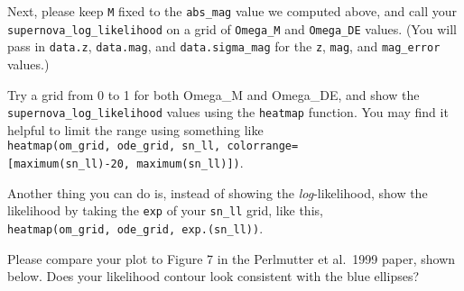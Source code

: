 \documentclass[11pt]{article}
\begin{document}
    Next, please keep \texttt{M} fixed to the \texttt{abs\_mag} value we
computed above, and call your \texttt{supernova\_log\_likelihood} on a
grid of \texttt{Omega\_M} and \texttt{Omega\_DE} values. (You will pass
in \texttt{data.z}, \texttt{data.mag}, and \texttt{data.sigma\_mag} for
the \texttt{z}, \texttt{mag}, and \texttt{mag\_error} values.)

Try a grid from 0 to 1 for both Omega\_M and Omega\_DE, and show the
\texttt{supernova\_log\_likelihood} values using the \texttt{heatmap}
function. You may find it helpful to limit the range using something
like
\texttt{heatmap(om\_grid,\ ode\_grid,\ sn\_ll,\ colorrange={[}maximum(sn\_ll)-20,\ maximum(sn\_ll){]})}.

Another thing you can do is, instead of showing the
\emph{log}-likelihood, show the likelihood by taking the \texttt{exp} of
your \texttt{sn\_ll} grid, like this,
\texttt{heatmap(om\_grid,\ ode\_grid,\ exp.(sn\_ll))}.

Please compare your plot to Figure 7 in the Perlmutter et al.~1999
paper, shown below. Does your likelihood contour look consistent with
the blue ellipses?
\end{document}
